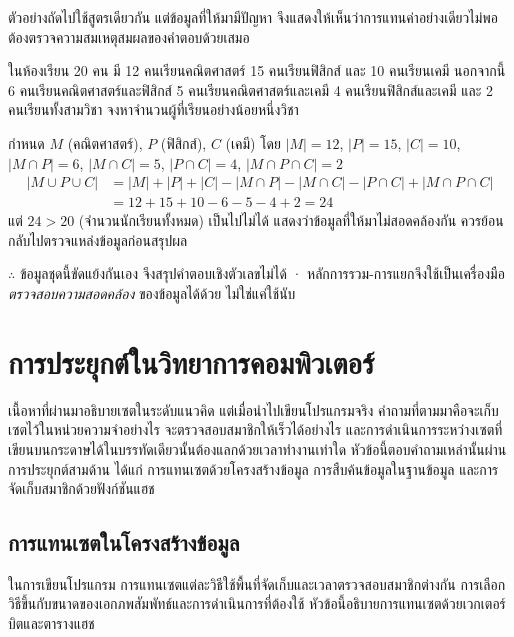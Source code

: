 ตัวอย่างถัดไปใช้สูตรเดียวกัน แต่ข้อมูลที่ให้มามีปัญหา จึงแสดงให้เห็นว่าการแทนค่าอย่างเดียวไม่พอ ต้องตรวจความสมเหตุสมผลของคำตอบด้วยเสมอ

\begin{ex}
\label{ex:data-inconsistency}
ในห้องเรียน 20 คน มี 12 คนเรียนคณิตศาสตร์ 15 คนเรียนฟิสิกส์ และ 10 คนเรียนเคมี นอกจากนี้ 6 คนเรียนคณิตศาสตร์และฟิสิกส์ 5 คนเรียนคณิตศาสตร์และเคมี 4 คนเรียนฟิสิกส์และเคมี และ 2 คนเรียนทั้งสามวิชา จงหาจำนวนผู้ที่เรียนอย่างน้อยหนึ่งวิชา
\end{ex}
\begin{solution}
กำหนด $M$ (คณิตศาสตร์), $P$ (ฟิสิกส์), $C$ (เคมี) โดย $|M|=12$, $|P|=15$, $|C|=10$, $|M \cap P|=6$, $|M \cap C|=5$, $|P \cap C|=4$, $|M \cap P \cap C|=2$
\begin{align*}
|M \cup P \cup C| &= |M|+|P|+|C|-|M\cap P|-|M\cap C|-|P\cap C|+|M\cap P\cap C|\\
                  &= 12+15+10-6-5-4+2 = 24
\end{align*}
แต่ $24 > 20$ (จำนวนนักเรียนทั้งหมด) เป็นไปไม่ได้ แสดงว่าข้อมูลที่ให้มาไม่สอดคล้องกัน ควรย้อนกลับไปตรวจแหล่งข้อมูลก่อนสรุปผล

$\therefore$ ข้อมูลชุดนี้ขัดแย้งกันเอง จึงสรุปคำตอบเชิงตัวเลขไม่ได้ · หลักการรวม-การแยกจึงใช้เป็นเครื่องมือ \emph{ตรวจสอบความสอดคล้อง} ของข้อมูลได้ด้วย ไม่ใช่แค่ใช้นับ \solhere
\end{solution}

\section{การประยุกต์ในวิทยาการคอมพิวเตอร์}

เนื้อหาที่ผ่านมาอธิบายเซตในระดับแนวคิด แต่เมื่อนำไปเขียนโปรแกรมจริง คำถามที่ตามมาคือจะเก็บเซตไว้ในหน่วยความจำอย่างไร จะตรวจสอบสมาชิกให้เร็วได้อย่างไร และการดำเนินการระหว่างเซตที่เขียนบนกระดาษได้ในบรรทัดเดียวนั้นต้องแลกด้วยเวลาทำงานเท่าใด หัวข้อนี้ตอบคำถามเหล่านั้นผ่านการประยุกต์สามด้าน ได้แก่ การแทนเซตด้วยโครงสร้างข้อมูล การสืบค้นข้อมูลในฐานข้อมูล และการจัดเก็บสมาชิกด้วยฟังก์ชันแฮช~\parencite{gersting2014structures}

\subsection{การแทนเซตในโครงสร้างข้อมูล}

ในการเขียนโปรแกรม การแทนเซตแต่ละวิธีใช้พื้นที่จัดเก็บและเวลาตรวจสอบสมาชิกต่างกัน การเลือกวิธีขึ้นกับขนาดของเอกภพสัมพัทธ์และการดำเนินการที่ต้องใช้ หัวข้อนี้อธิบายการแทนเซตด้วยเวกเตอร์บิตและตารางแฮช~\parencite{gersting2014structures}

